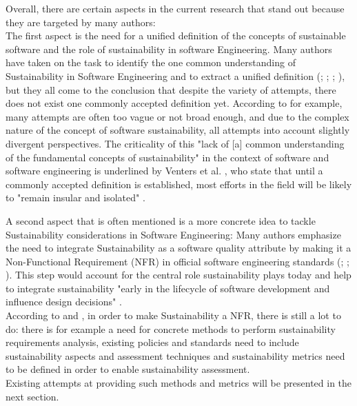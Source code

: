 \documentclass[oribibl]{llncs}
\begin{document}
Overall, there are certain aspects in the current research that stand out because they are targeted by many authors:\\
The first aspect is the need for a unified definition of the concepts of sustainable software %
and the role of sustainability in software Engineering. Many authors have taken on the task to identify the one common understanding of Sustainability in Software Engineering and to extract a unified definition (\cite{venters_software_2014};%
\cite{becker_sustainability_2015}%
; \cite{calero_green_2015} ; \cite{penzenstadler_what_13}), but they all come to the conclusion that despite the variety of attempts, there does not exist one commonly accepted definition yet. According to \cite{venters_software_2014} for example, many attempts are often too vague or not broad enough, and due to the complex nature of the concept of software sustainability, all attempts into account slightly divergent perspectives. %
The criticality %
of this "lack of [a] common understanding of the fundamental concepts of sustainability" \cite{becker_sustainability_2015} in the context of software and software engineering is underlined by Venters et al. \cite{venters_software_2014}, who state that until a commonly accepted definition is established, most efforts in the field will be likely to "remain insular and isolated" \cite{venters_software_2014}. %

A second aspect that is often mentioned is a more concrete idea to tackle Sustainability considerations in Software Engineering: Many authors emphasize the need to integrate Sustainability as a software quality attribute by making it a Non-Functional Requirement (NFR) %
in official software engineering standards (\cite{penzenstadler_safety_2014}; \cite{amsel_toward_2011}; \cite{agarwal_sustainable_2012}). This step would account for the central role sustainability plays today \cite{penzenstadler_safety_2014} and help to integrate sustainability "early in the lifecycle of software development and influence design decisions" \cite{raturi_developing_2014}.\\ %
According to \cite{penzenstadler_safety_2014} and \cite{venters_software_2014}, in order to make Sustainability a NFR, there is still a lot to do: there is for example a need for concrete methods to perform sustainability requirements analysis, existing policies and standards need to include sustainability aspects and %
assessment techniques and sustainability metrics need to be defined in order to enable sustainability assessment.\\
Existing attempts at providing such methods and metrics will be presented in the next section. %
\end{document}
